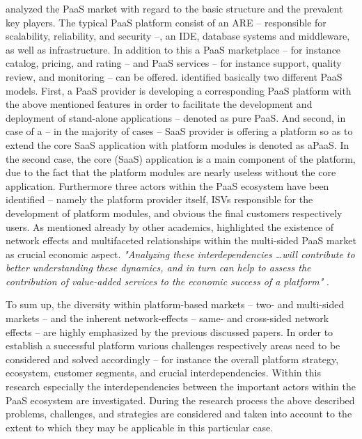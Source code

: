 \citet{Beimborn2011} analyzed the \ac{PaaS} market with regard to the basic structure and the prevalent key players. The typical \ac{PaaS} platform consist of an \ac{ARE} -- responsible for scalability, reliability, and security --, an \ac{IDE}, database systems and middleware, as well as infrastructure. In addition to this a \ac{PaaS} marketplace -- for instance catalog, pricing, and rating -- and \ac{PaaS} services -- for instance support, quality review, and monitoring -- can be offered. \citet{Beimborn2011} identified basically two different \ac{PaaS} models. First, a \ac{PaaS} provider is developing a corresponding \ac{PaaS} platform with the above mentioned features in order to facilitate the development and deployment of stand-alone applications -- denoted as pure \ac{PaaS}. And second, in case of a -- in the majority of cases -- \ac{SaaS} provider is offering a platform so as to extend the core \ac{SaaS} application with platform modules is denoted as \ac{aPaaS}. In the second case, the core (\ac{SaaS}) application is a main component of the platform, due to the fact that the platform modules are nearly useless without the core application. Furthermore three actors within the \ac{PaaS} ecosystem have been identified -- namely the platform provider itself, \acp{ISV} responsible for the development of platform modules, and obvious the final customers respectively users. As mentioned already by other academics, \citet{Beimborn2011} highlighted the existence of network effects and multifaceted relationships within the multi-sided \ac{PaaS} market as crucial economic aspect. \textit{"Analyzing these interdependencies \ldots will contribute to better understanding these dynamics, and in turn can help to assess the contribution of value-added services to the economic success of a platform"} \citep[p. 84]{Beimborn2011}.

To sum up, the diversity within platform-based markets -- two- and multi-sided markets -- and the inherent network-effects -- same- and cross-sided network effects -- are highly emphasized by the previous discussed papers. In order to establish a successful platform various challenges respectively areas need to be considered and solved accordingly -- for instance the overall platform strategy, ecosystem, customer segments, and crucial interdependencies. Within this research especially the interdependencies between the important actors within the \ac{PaaS} ecosystem are investigated. During the research process the above described problems, challenges, and strategies are considered and taken into account to the extent to which they may be applicable in this particular case.

